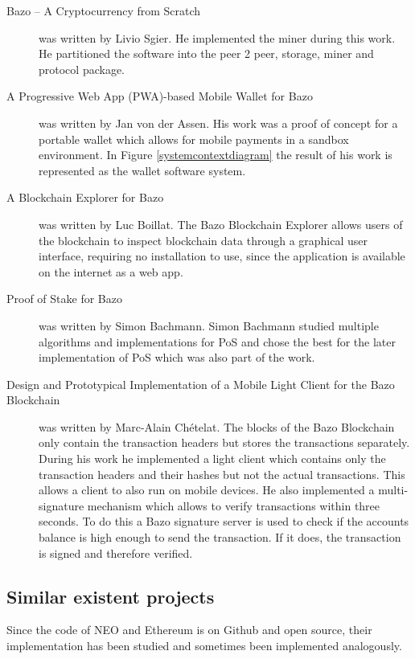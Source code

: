 \begin{description}
	\item [Bazo – A Cryptocurrency from Scratch \cite{ba_miner}] was written by Livio Sgier. He implemented the miner during this work. He partitioned the software into the peer 2 peer, storage, miner and protocol package.
	\item [A Progressive Web App (PWA)-based Mobile Wallet for Bazo \cite{ba_wallet}] was written by Jan von der Assen. His work was a proof of concept for a portable wallet which allows for mobile payments in a sandbox environment. In Figure \ref{systemcontextdiagram} the result of his work is represented as the wallet software system.
	\item [A Blockchain Explorer for Bazo \cite{ba_explorer}] was written by Luc Boillat. The Bazo Blockchain Explorer allows users of the blockchain to inspect blockchain data through a graphical user interface, requiring no installation to use, since the application is available on the internet as a web app. \cite{ba_explorer}
	\item [Proof of Stake for Bazo \cite{ba_pos}] was written by Simon Bachmann. Simon Bachmann studied multiple algorithms and implementations for PoS and chose the best for the later implementation of PoS which was also part of the work.
	\item [Design and Prototypical Implementation of a Mobile Light Client for the Bazo Blockchain \cite{ba_client}] was written by Marc-Alain Chételat. The blocks of the Bazo Blockchain only contain the transaction headers but stores the transactions separately. During his work he implemented a light client which contains only the transaction headers and their hashes but not the actual transactions. This allows a client to also run on mobile devices. He also 	implemented a multi-signature mechanism which allows to verify transactions within three seconds.  To do this a Bazo signature server is used to check if the accounts balance is high enough to send the transaction. If it does, the transaction is signed and therefore verified. 
\end{description}

\subsection{Similar existent projects}
Since the code of NEO and Ethereum is on Github and open source, their implementation has been studied and sometimes been implemented analogously. 

